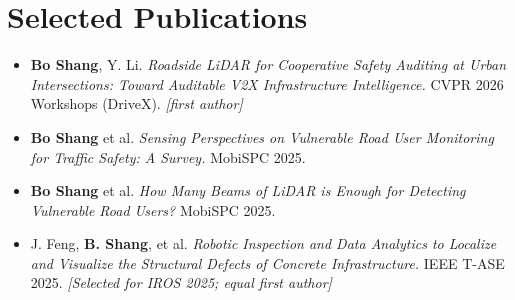 \documentclass[letterpaper,10pt]{article}
\newcommand{\resumeBullet}[1]{
  \item\small{#1 \vspace{-2pt}}
}
\newcommand{\resumeSubHeadingListStart}{\begin{itemize}[leftmargin=*]}
\newcommand{\resumeSubHeadingListEnd}{\end{itemize}}
\begin{document}
\section{Selected Publications}
  \resumeSubHeadingListStart
    \resumeBullet{\textbf{Bo Shang}, Y. Li. \textit{Roadside LiDAR for Cooperative Safety Auditing at Urban Intersections: Toward Auditable V2X Infrastructure Intelligence.} CVPR 2026 Workshops (DriveX). \textit{[first author]}}
    \resumeBullet{\textbf{Bo Shang} et al. \textit{Sensing Perspectives on Vulnerable Road User Monitoring for Traffic Safety: A Survey.} MobiSPC 2025.}
    \resumeBullet{\textbf{Bo Shang} et al. \textit{How Many Beams of LiDAR is Enough for Detecting Vulnerable Road Users?} MobiSPC 2025.}
    \resumeBullet{J. Feng, \textbf{B. Shang}, et al. \textit{Robotic Inspection and Data Analytics to Localize and Visualize the Structural Defects of Concrete Infrastructure.} IEEE T-ASE 2025. \textit{[Selected for IROS 2025; equal first author]}}
  \resumeSubHeadingListEnd
\end{document}
